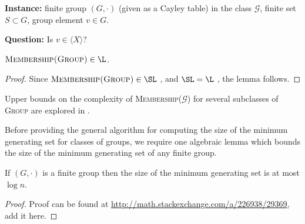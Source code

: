 \documentclass{article}
\newcommand{\gen}[1]{{\langle #1 \rangle}}
\begin{document}
\begin{definition}
  \mbox{}

  \textbf{Instance:} finite group $(G, \cdot)$ (given as a Cayley table) in the class $\mathcal{G}$, finite set $S \subset G$, group element $v \in G$.

  \textbf{Question:} Is $v \in \gen{X}$?
\end{definition}

\begin{lemma}\label{lem:membershipinl}
  $\textsc{Membership(Group)} \in \L$.
\end{lemma}
\begin{proof}
  Since $\textsc{Membership(Group)} \in \SL$ \cite[Section~3]{bm89}, and $\SL = \L$ \cite{reingold08}, the lemma follows.
\end{proof}

Upper bounds on the complexity of \textsc{Membership($\mathcal{G}$)} for several subclasses of \textsc{Group} are explored in \cite{bklm01}.

Before providing the general algorithm for computing the size of the minimum generating set for classes of groups, we require one algebraic lemma which bounds the size of the minimum generating set of any finite group.

\begin{lemma}\label{lem:log}
  If $(G, \cdot)$ is a finite group then the size of the minimum generating set is at most $\log n$.
\end{lemma}
\begin{proof}
  Proof can be found at \url{http://math.stackexchange.com/a/226938/29369}, add it here.
\end{proof}
\end{document}
